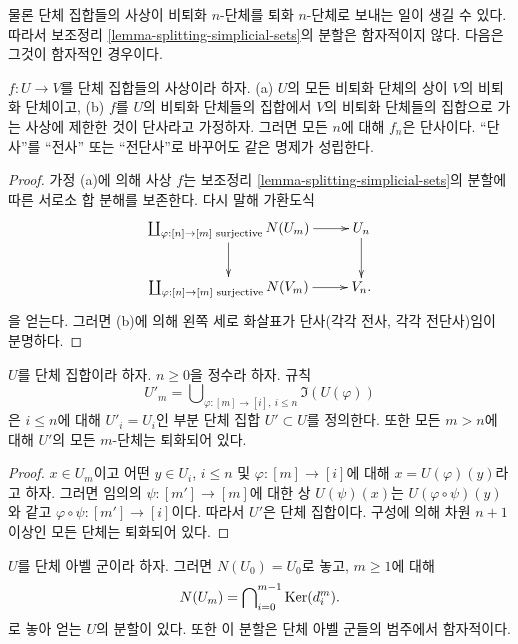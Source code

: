 \noindent
물론 단체 집합들의 사상이 비퇴화 $n$-단체를 퇴화 $n$-단체로
보내는 일이 생길 수 있다. 따라서 보조정리
\ref{lemma-splitting-simplicial-sets}의 분할은 함자적이지 않다.
다음은 그것이 함자적인 경우이다.

\begin{lemma}
\label{lemma-injective-map-simplicial-sets}
$f : U \to V$를 단체 집합들의 사상이라 하자.
(a) $U$의 모든 비퇴화 단체의 상이 $V$의 비퇴화 단체이고,
(b) $f$를 $U$의 비퇴화 단체들의 집합에서 $V$의 비퇴화 단체들의
집합으로 가는 사상에 제한한 것이 단사라고 가정하자.
그러면 모든 $n$에 대해 $f_n$은 단사이다.
``단사''를 ``전사'' 또는 ``전단사''로 바꾸어도 같은 명제가 성립한다.
\end{lemma}

\begin{proof}
가정 (a)에 의해 사상 $f$는 보조정리
\ref{lemma-splitting-simplicial-sets}의 분할에 따른 서로소 합 분해를
보존한다. 다시 말해 가환도식
$$
\xymatrix{
\coprod\nolimits_{\varphi : [n] \to [m]\text{ surjective}}
N(U_m)
\ar[r] \ar[d] &
U_n \ar[d] \\
\coprod\nolimits_{\varphi : [n] \to [m]\text{ surjective}}
N(V_m)
\ar[r] &
V_n.
}
$$
을 얻는다. 그러면 (b)에 의해 왼쪽 세로 화살표가 단사(각각 전사,
각각 전단사)임이 분명하다.
\end{proof}

\begin{lemma}
\label{lemma-simplicial-set-n-skel-sub}
$U$를 단체 집합이라 하자. $n \geq 0$을 정수라 하자. 규칙
$$
U'_m = \bigcup\nolimits_{\varphi : [m] \to [i], \ i\leq n} \Im(U(\varphi))
$$
은 $i \leq n$에 대해 $U'_i = U_i$인 부분 단체 집합
$U' \subset U$를 정의한다. 또한 모든 $m > n$에 대해
$U'$의 모든 $m$-단체는 퇴화되어 있다.
\end{lemma}

\begin{proof}
$x \in U_m$이고 어떤 $y \in U_i$, $i \leq n$ 및
$\varphi : [m] \to [i]$에 대해 $x = U(\varphi)(y)$라고 하자.
그러면 임의의 $\psi : [m'] \to [m]$에 대한 상 $U(\psi)(x)$는
$U(\varphi \circ \psi)(y)$와 같고
$\varphi \circ \psi : [m'] \to [i]$이다.
따라서 $U'$은 단체 집합이다. 구성에 의해 차원 $n + 1$ 이상인
모든 단체는 퇴화되어 있다.
\end{proof}

\begin{lemma}
\label{lemma-splitting-simplicial-groups}
$U$를 단체 아벨 군이라 하자. 그러면 $N(U_0) = U_0$로 놓고,
$m \geq 1$에 대해
$$
N(U_m) = \bigcap\nolimits_{i = 0}^{m - 1} \mathop{\mathrm{Ker}}(d^m_i).
$$
로 놓아 얻는 $U$의 분할이 있다. 또한 이 분할은 단체 아벨 군들의
범주에서 함자적이다.
\end{lemma}

